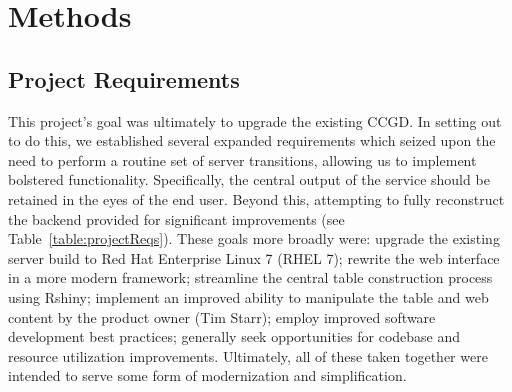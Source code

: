 \documentclass[10pt]{report}
\begin{document}
\section{Methods}

\subsection{Project Requirements}
This project's goal was ultimately to upgrade the existing CCGD\@. In setting out to do this, we established several expanded requirements which seized upon the need to perform a routine set of server transitions, allowing us to implement bolstered functionality. Specifically, the central output of the service should be retained in the eyes of the end user. Beyond this, attempting to fully reconstruct the backend provided for significant improvements (see Table~\ref{table:projectReqs}). These goals more broadly were: upgrade the existing server build to Red Hat Enterprise Linux 7 (RHEL 7); rewrite the web interface in a more modern framework; streamline the central table construction process using Rshiny; implement an improved ability to manipulate the table and web content by the product owner (Tim Starr); employ improved software development best practices; generally seek opportunities for codebase and resource utilization improvements. Ultimately, all of these taken together were intended to serve some form of modernization and simplification.
\end{document}
